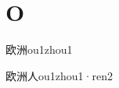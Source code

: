 \section*{O}

\begin{verbete*}[8;9]{欧洲}{ou1zhou1}
\end{verbete*}

\begin{verbete}[8;9;2]{欧洲人}{ou1zhou1·ren2}
\end{verbete}


